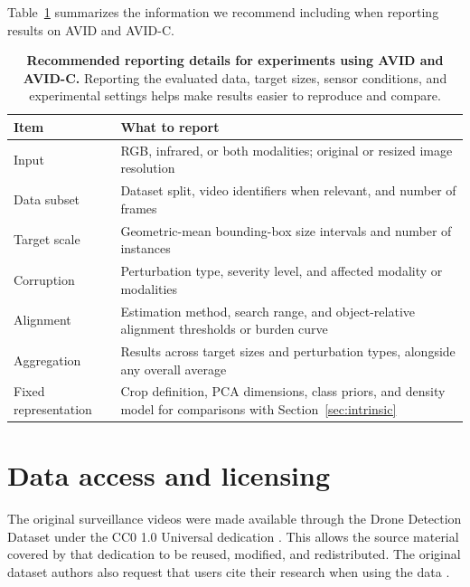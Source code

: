 \documentclass[10pt]{article}
\newcommand{\dataset}{\textsc{AVID}}
\newcommand{\corrupt}{\textsc{AVID-C}}
\begin{document}
Table~\ref{tab:reporting} summarizes the information we recommend including when reporting results on \dataset{} and \corrupt{}.

\begin{table}[t]
\centering
\caption{\textbf{Recommended reporting details for experiments using \dataset{} and \corrupt{}.}
Reporting the evaluated data, target sizes, sensor conditions, and experimental settings helps make results easier to reproduce and compare.}
\label{tab:reporting}
\small
\begin{tabularx}{\linewidth}{@{}l X@{}}
\toprule
Item & What to report \\
\midrule

Input
& RGB, infrared, or both modalities; original or resized image resolution \\

Data subset
& Dataset split, video identifiers when relevant, and number of frames \\

Target scale
& Geometric-mean bounding-box size intervals and number of instances \\

Corruption
& Perturbation type, severity level, and affected modality or modalities \\

Alignment
& Estimation method, search range, and object-relative alignment thresholds or burden curve \\

Aggregation
& Results across target sizes and perturbation types, alongside any overall average \\

Fixed representation
& Crop definition, PCA dimensions, class priors, and density model for comparisons with Section~\ref{sec:intrinsic} \\

\bottomrule
\end{tabularx}
\end{table}


\section{Data access and licensing}
\label{sec:repro}

The original surveillance videos were made available through the Drone Detection Dataset under the CC0 1.0 Universal dedication \citep{svanstrom2020repository}. This allows the source material covered by that dedication to be reused, modified, and redistributed. The original dataset authors also request that users cite their research when using the data \citep{svanstrom2021multisensor}.
\end{document}
